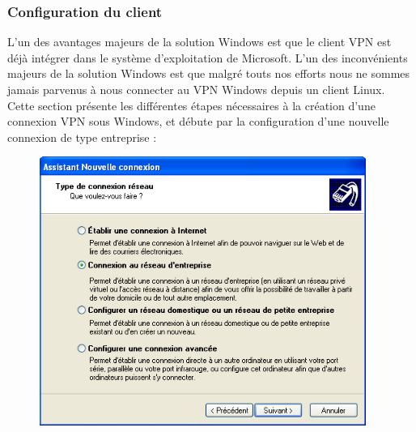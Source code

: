 \subsubsection{Configuration du client}

L'un des avantages majeurs de la solution Windows est que le client VPN est déjà intégrer dans le système d'exploitation de Microsoft. L'un des inconvénients majeurs de la solution Windows est que malgré touts nos efforts nous ne sommes jamais parvenus à nous connecter au VPN Windows depuis un client Linux. Cette section présente les différentes étapes nécessaires à la création d'une connexion VPN sous Windows, et débute par la configuration d'une nouvelle connexion de type entreprise :

\begin{figure}[H]
	\begin{minipage}{0.5\textwidth}
		\begin{flushleft} \large
			\includegraphics[width=0.95\textwidth]{partie_2/screen_windows/etape1.PNG}\\
		\end{flushleft}
	\end{minipage}
	\begin{minipage}{0.49\textwidth}
		\begin{flushright} \large

\end{flushright}
\end{minipage}
\end{figure}
